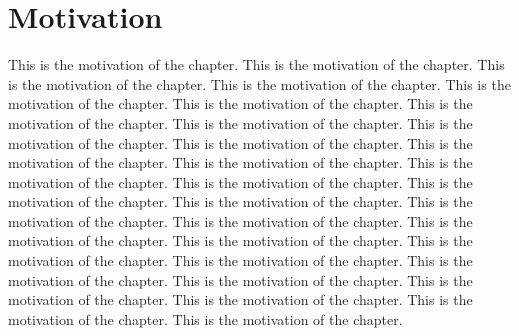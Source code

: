 \documentclass{nithreport}
\begin{document}
\chapter{Motivation}
This is the motivation of the chapter. This is the motivation of the chapter. This is the motivation of the chapter. This is the motivation of the chapter. This is the motivation of the chapter. This is the motivation of the chapter. This is the motivation of the chapter. This is the motivation of the chapter. This is the motivation of the chapter. This is the motivation of the chapter. This is the motivation of the chapter. This is the motivation of the chapter. This is the motivation of the chapter. This is the motivation of the chapter. This is the motivation of the chapter. This is the motivation of the chapter. This is the motivation of the chapter. This is the motivation of the chapter. This is the motivation of the chapter. This is the motivation of the chapter. This is the motivation of the chapter. This is the motivation of the chapter. This is the motivation of the chapter. This is the motivation of the chapter. This is the motivation of the chapter. This is the motivation of the chapter. This is the motivation of the chapter. This is the motivation of the chapter. 



\end{document}
